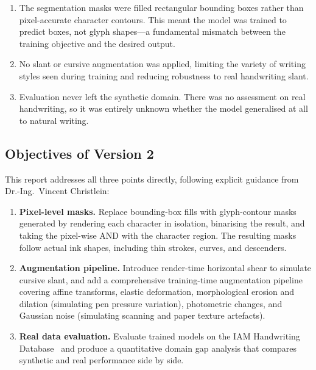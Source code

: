 \documentclass[a4paper,11pt]{article}
\begin{document}
\begin{enumerate}[leftmargin=*, label=(\arabic*)]
    \item The segmentation masks were filled rectangular bounding boxes rather than
          pixel-accurate character contours. This meant the model was trained to predict
          boxes, not glyph shapes---a fundamental mismatch between the training objective
          and the desired output.
    \item No slant or cursive augmentation was applied, limiting the variety of writing
          styles seen during training and reducing robustness to real handwriting slant.
    \item Evaluation never left the synthetic domain. There was no assessment on real
          handwriting, so it was entirely unknown whether the model generalised at all to
          natural writing.
\end{enumerate}

\subsection{Objectives of Version 2}

This report addresses all three points directly, following explicit guidance from
Dr.-Ing.\ Vincent Christlein:

\begin{enumerate}[leftmargin=*, label=(\arabic*)]
    \item \textbf{Pixel-level masks.} Replace bounding-box fills with glyph-contour masks
          generated by rendering each character in isolation, binarising the result, and
          taking the pixel-wise AND with the character region. The resulting masks follow
          actual ink shapes, including thin strokes, curves, and descenders.
    \item \textbf{Augmentation pipeline.} Introduce render-time horizontal shear to
          simulate cursive slant, and add a comprehensive training-time augmentation
          pipeline covering affine transforms, elastic deformation, morphological erosion
          and dilation (simulating pen pressure variation), photometric changes, and
          Gaussian noise (simulating scanning and paper texture artefacts).
    \item \textbf{Real data evaluation.} Evaluate trained models on the IAM Handwriting
          Database~\cite{marti2002} and produce a quantitative domain gap analysis that
          compares synthetic and real performance side by side.
\end{enumerate}
\end{document}
